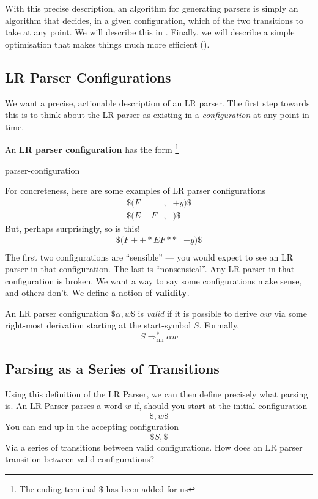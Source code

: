 With this precise description, an algorithm for generating parsers is simply an algorithm that decides, in a given configuration, which of the two transitions to take at any point. We will describe this in . Finally, we will describe a simple optimisation that makes things much more efficient ().

\subsection{LR Parser Configurations}\label{section:lr-parser-configurations}
We want a precise, actionable description of an LR parser. The first step towards this is to think about the LR parser as existing in a \textit{configuration} at any point in time.

An \textbf{LR parser configuration} has the form \footnote{The ending terminal $\$$ has been added for us}
\begin{center}
    {parser-configuration}
\end{center}
For concreteness, here are some examples of LR parser configurations
\[\begin{array}{lcr}
     \$(F   &,& +y)\$  \\
     \$(E+F &,&   )\$
\end{array}\]
But, perhaps surprisingly, so is this!
\[\begin{array}{lr}
     \$(F++*EF** & +y)\$  \\
\end{array}\]
The first two configurations are ``sensible'' --- you would expect to see an LR parser in that configuration. The last is ``nonsensical''. Any LR parser in that configuration is broken. We want a way to say some configurations make sense, and others don't. We define a notion of \textbf{validity}.

An LR parser configuration $\$\alpha, w\$$ is \textit{valid} if it is possible to derive $\alpha w$ via some right-most derivation starting at the start-symbol $S$. Formally,
\[S \Rightarrow^*_{\text{rm}} \alpha w\]

\subsection{Parsing as a Series of Transitions}\label{section:lr-goals}
Using this definition of the LR Parser, we can then define precisely what parsing is. An LR Parser parses a word $w$ if, should you start at the initial configuration
\[\$, w\$\]
You can end up in the accepting configuration
\[\$S, \$\]
Via a series of transitions between valid configurations. How does an LR parser transition between valid configurations?

